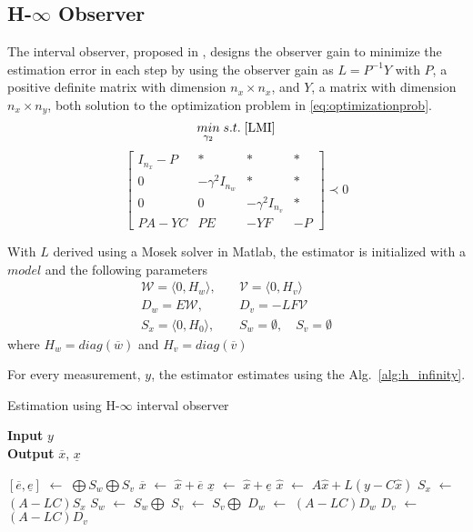 \subsection{H-$\infty$ Observer}
The interval observer, proposed in \cite{Tang2019}, designs the observer gain to minimize the estimation error in each step by using the observer gain as $L= P^{-1}Y$ with $P$, a positive definite matrix with dimension $n_x \times n_x$, and $Y$, a matrix with dimension $n_x \times n_y$, both solution to the optimization problem in \eqref{eq:optimizationprob}.
\begin{equation}
\label{eq:optimizationprob}
\underset{\gamma _2}{min} \;
s.t. \; \eqref{LMI}
\end{equation} 
\begin{equation}
\label{LMI}
\left[\begin{matrix}
I_{n_x} -P & * & * & *\\
0 & -\gamma ^2 I_{n_w} & * &* \\
0 & 0 & -\gamma ^2 I_{n_v} & *\\
PA-YC & PE & -YF & -P
\end{matrix}\right]  \prec 0
\end{equation} 

With $L$ derived using a Mosek solver in Matlab\textsuperscript{\tiny\textregistered}, the estimator is initialized with a $model$ and the following parameters\\
\begin{equation}
\begin{split}
\mathcal{W} = \langle 0, H_w\rangle,& \quad \mathcal{V} = \langle 0,H_v\rangle\\
D_w = E\mathcal{W}, & \quad D_v = -LF\mathcal{V}\\
S_x= \langle 0, H_0\rangle, &\quad S_w = \emptyset,\quad S_v = \emptyset
\end{split}
\end{equation}
where $H_w = diag(\overline{w})$ and $H_v= diag(\overline{v})$

For every measurement, $y$, the estimator estimates using the Alg.~\ref{alg:h_infinity}.
\begin{algorithm}
		
        \caption{Estimation using H-$\infty$ interval observer}
        \textbf{Input} $y$\\
 		\textbf{Output} $\overline{x}$, $\underline{x}$
        \begin{algorithmic}[1]
        \State $[\overline{e}, \underline{e}]$ $\gets$ $\bigoplus S_w \bigoplus S_v$ \label{alg:main_constraints}
        \State $\overline{x}$ $\gets$ $\hat{x} + \overline{e}$
        \State $\underline{x}$ $\gets$ $\hat{x} + \underline{e}$
        \State $\hat{x}$ $\gets$ $A\hat{x} + L(y- C\hat{x})$ \label{alg:main_reac}
        \State $S_x$ $\gets$ $(A-LC)S_x$
        \State $S_w$ $\gets$ $S_w \bigoplus$ 
        \State $S_v$ $\gets$ $S_v \bigoplus$ 
        \State $D_w$ $\gets$ $(A-LC)D_w$
        \State $D_v$ $\gets$ $(A-LC)D_v$
        \end{algorithmic}
        \label{alg:h_infinity}
\end{algorithm}



